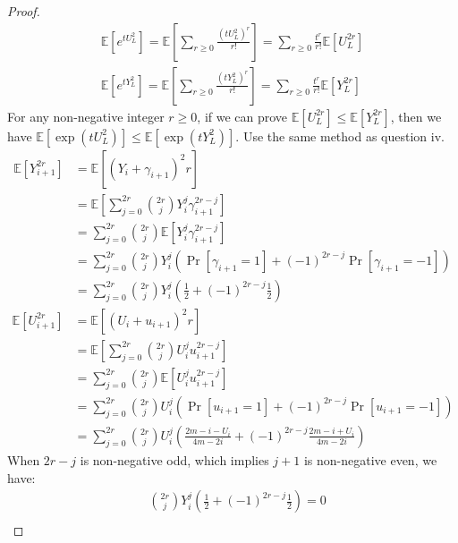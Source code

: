 \begin{proof}
    \begin{align}
        \nonumber \mathbb{E}[e^{tU_L^2}]=\mathbb{E}[\sum_{r\ge 0}\frac{(tU_L^2)^r}{r!}]=\sum_{r\ge 0}\frac{t^r}{r!}\mathbb{E}[U_L^{2r}]\\
        \nonumber \mathbb{E}[e^{tY_L^2}]=\mathbb{E}[\sum_{r\ge 0}\frac{(tY_L^2)^r}{r!}]=\sum_{r\ge 0}\frac{t^r}{r!}\mathbb{E}[Y_L^{2r}]
    \end{align}
    For any non-negative integer $r\ge0$, if we can prove $\mathbb{E}[U_L^{2r}]\le \mathbb{E}[Y_L^{2r}]$, then we have $\mathbb{E}[\exp(tU_L^2)]\le \mathbb{E}[\exp(tY_L^2)]$.
    Use the same method as question iv.
    \begin{align}
        \nonumber \mathbb{E}[Y_{i+1}^{2r}]&=\mathbb{E}[(Y_i+\gamma_{i+1})^2r]\\
        \nonumber &=\mathbb{E}\left[\sum_{j=0}^{2r}\binom{2r}{j}Y_i^j\gamma_{i+1}^{2r-j}\right]\\
        \nonumber &=\sum_{j=0}^{2r}\binom{2r}{j}\mathbb{E}\left[Y_i^j\gamma_{i+1}^{2r-j}\right]\\
        \nonumber &=\sum_{j=0}^{2r}\binom{2r}{j}Y_i^j\left(\Pr\left[\gamma_{i+1}=1\right]+(-1)^{2r-j}\Pr\left[\gamma_{i+1}=-1\right]\right)\\ 
        \nonumber &=\sum_{j=0}^{2r}\binom{2r}{j}Y_i^j\left(\frac{1}{2}+(-1)^{2r-j}\frac{1}{2}\right)
    \end{align}
    \begin{align}
        \nonumber \mathbb{E}[U_{i+1}^{2r}]&=\mathbb{E}[(U_i+u_{i+1})^2r]\\
        \nonumber &=\mathbb{E}\left[\sum_{j=0}^{2r}\binom{2r}{j}U_i^ju_{i+1}^{2r-j}\right]\\
        \nonumber &=\sum_{j=0}^{2r}\binom{2r}{j}\mathbb{E}\left[U_i^ju_{i+1}^{2r-j}\right]\\
        \nonumber &=\sum_{j=0}^{2r}\binom{2r}{j}U_i^j\left(\Pr\left[u_{i+1}=1\right]+(-1)^{2r-j}\Pr\left[u_{i+1}=-1\right]\right)\\
        \nonumber &=\sum_{j=0}^{2r}\binom{2r}{j}U_i^j\left(\frac{2m-i-U_i}{4m-2i}+(-1)^{2r-j}\frac{2m-i+U_i}{4m-2i}\right)
    \end{align}
    When $2r-j$ is non-negative odd, which implies $j+1$ is non-negative even, we have:
    \begin{align}
        \nonumber &\binom{2r}{j}Y_i^j\left(\frac{1}{2}+(-1)^{2r-j}\frac{1}{2}\right)=0\\

\end{align}
\end{proof}
